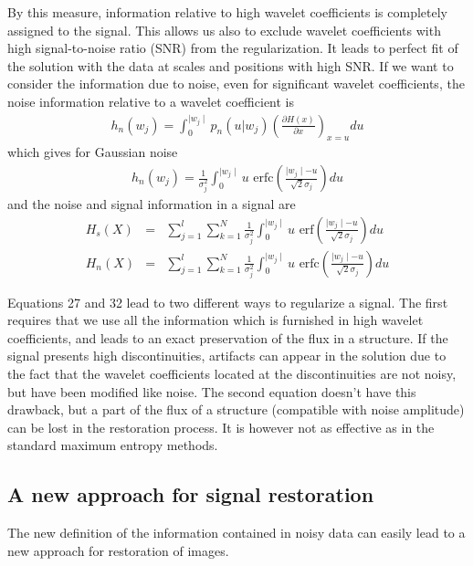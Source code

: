 \documentclass[11pt,a4paper]{article}
\begin{document}
By this measure, information relative to high wavelet coefficients is  
completely assigned to the signal. This allows us also to exclude
wavelet coefficients with high signal-to-noise ratio (SNR)
from the regularization.
It leads to perfect fit of the solution with the data at scales and
 positions with high SNR. If we want to consider the information due
to noise, even for significant wavelet coefficients, the noise information
relative to a wavelet coefficient is 
\begin{eqnarray}
h_n(w_j) =  \int_{0}^{\mid w_j \mid } p_n(u|w_j) (\frac{\partial H(x)}{\partial 
x})_{x=u} du
\end{eqnarray}
which gives for Gaussian noise
\begin{eqnarray}
h_n(w_j) =  \frac{1}{\sigma_j^2} \int_{0}^{\mid w_j \mid} u \mbox{ 
erfc}(\frac{\mid w_j \mid -u}{\sqrt{2} \sigma_j}) du
\label{eqn_hn2}
\end{eqnarray}
and the noise and signal information in a signal are
\begin{eqnarray}
H_s(X) & = & \sum_{j=1}^{l}  \sum_{k=1}^{N}  \frac{1}{\sigma_j^2} \int_{0}^{\mid 
w_j \mid} u \mbox{ erf}(\frac{\mid w_j \mid -u}{\sqrt{2} \sigma_j}) du \\ 
\nonumber 
H_n(X) & = & \sum_{j=1}^{l}  \sum_{k=1}^{N}   \frac{1}{\sigma_j^2} \int_{0}^{\mid 
w_j \mid} u \mbox{ erfc}(\frac{\mid w_j \mid -u}{\sqrt{2} \sigma_j}) du  
\label{eq_entrop_result_2}
\end{eqnarray}

Equations 27 and 32 lead to two
different ways to regularize a signal. The first requires that we use
all the information which is furnished in high wavelet coefficients, and 
leads to an exact preservation of the flux in a structure. If the signal
presents high discontinuities, artifacts can appear in the solution 
due to the fact that the wavelet coefficients located at the discontinuities
are not noisy, but have been modified like noise. The second equation 
doesn't have this drawback, but a part of the flux of a structure
(compatible with noise amplitude) can be lost in the restoration process. 
It is however not as effective as in the standard maximum entropy methods.

\subsection{A new approach for signal restoration}
The new  definition of the information contained
in noisy data can easily lead to a new approach for restoration of images.
\end{document}
